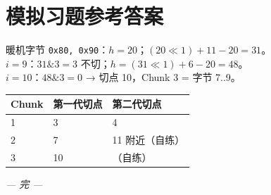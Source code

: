 \section{模拟习题参考答案}

\begin{simbox}[Chunk 3（第一代，pos=7）]
暖机字节 \texttt{0x80, 0x90}：$h=20$；$(20 \ll 1)+11-20=31$。\\
$i=9$：$31\&3=3$ 不切；$h=(31 \ll 1)+6-20=48$。\\
$i=10$：$48\&3=0$ → 切点 10，Chunk 3 = 字节 7..9。
\end{simbox}

\begin{simbox}
\begin{tabular}{@{}lll@{}}
\toprule
\textbf{Chunk} & \textbf{第一代切点} & \textbf{第二代切点} \\
\midrule
1 & 3 & 4 \\
2 & 7 & 11 附近（自练） \\
3 & 10 & （自练） \\
\bottomrule
\end{tabular}
\end{simbox}

\vspace{2em}
\noindent\textit{— 完 —}
